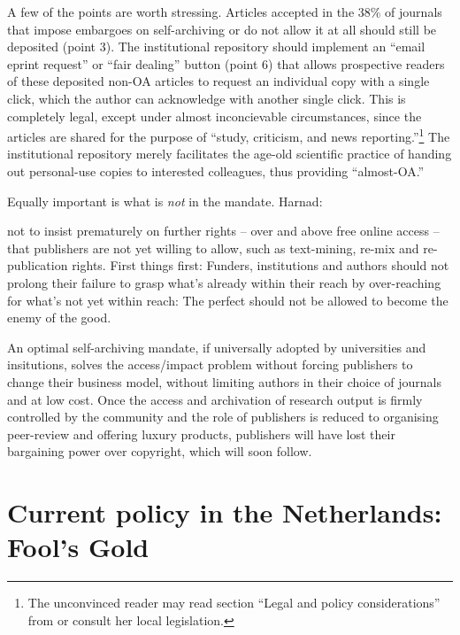 \documentclass[11pt, openany, oneside, article, a4paper, twocolumn]{memoir}
\begin{document}
A few of the points are worth stressing. Articles accepted in the 38\%
\cite{bjork2014anatomy} of journals that impose embargoes on
self-archiving or do not allow it at all should still be deposited (point
3).
The institutional repository should implement an \enquote{email eprint
request} or \enquote{fair dealing} button \cite{sale2010open} (point 6) that allows
prospective readers of these deposited non-OA articles to request an individual
copy with a single click, which the author can acknowledge with
another single click. This is completely legal, except under almost
inconcievable circumstances, since the articles are shared for the purpose of
\enquote{study, criticism, and news reporting.}\footnote{The unconvinced reader may
read section \enquote{Legal and policy considerations} from \cite{sale2010open}
or consult her local legislation.} The institutional repository merely
facilitates the age-old scientific practice of handing out personal-use copies
to interested colleagues, thus providing \enquote{almost-OA.}

Equally important is what is \emph{not} in the mandate. Harnad:
\begin{displayquote}
\begin{small}
[It is essential] not to insist prematurely on further rights
-- over and above free online access -- that publishers are not yet willing to
allow, such as text-mining, re-mix and re-publication rights. First things
first: Funders, institutions and authors should not prolong their failure to
grasp what's already within their reach by over-reaching for what's not yet
within reach: The perfect should not be allowed to become the enemy of the
good.
\end{small}
\end{displayquote}

An optimal self-archiving mandate, if universally adopted by universities and insitutions, solves
the access/impact problem without forcing publishers to change
their business model, without limiting authors in their choice of journals and at low cost.
Once the access and archivation of research output is firmly controlled by the community
and the role of publishers is reduced to organising peer-review and
offering luxury products, publishers will have lost their bargaining power
over copyright, which will soon follow.

\section{Current policy in the Netherlands: Fool's Gold}
\end{document}

